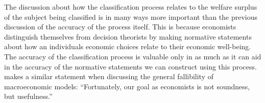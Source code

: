 \documentclass[../main.tex]{subfiles}
\begin{document}
%

The discussion about how the classification process relates to the welfare surplus of the subject being classified is in many ways more important than the previous discussion of the accuracy of the process itself.
This is because economists distinguish themselves from decision theorists by making normative statements about how an individuals economic choices relate to their economic well-being.
The accuracy of the classification process is valuable only in as much as it can aid in the accuracy of the normative statements we can construct using this process.
\textcite[25]{Leamer2012} makes a similar statement when discussing the general fallibility of macroeconomic models: \enquote{Fortunately, our goal as economists is not soundness, but usefulness.}
\end{document}
